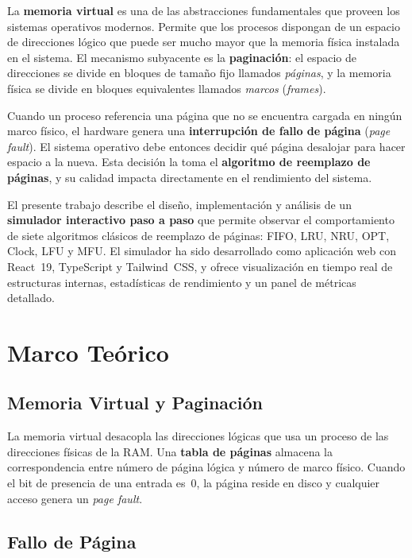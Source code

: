 \documentclass[12pt, a4paper]{article}
\begin{document}
La \textbf{memoria virtual} es una de las abstracciones fundamentales que proveen los sistemas operativos modernos. Permite que los procesos dispongan de un espacio de direcciones lógico que puede ser mucho mayor que la memoria física instalada en el sistema. El mecanismo subyacente es la \textbf{paginación}: el espacio de direcciones se divide en bloques de tamaño fijo llamados \emph{páginas}, y la memoria física se divide en bloques equivalentes llamados \emph{marcos} (\textit{frames}).

Cuando un proceso referencia una página que no se encuentra cargada en ningún marco físico, el hardware genera una \textbf{interrupción de fallo de página} (\textit{page fault}). El sistema operativo debe entonces decidir qué página desalojar para hacer espacio a la nueva. Esta decisión la toma el \textbf{algoritmo de reemplazo de páginas}, y su calidad impacta directamente en el rendimiento del sistema.

El presente trabajo describe el diseño, implementación y análisis de un \textbf{simulador interactivo paso a paso} que permite observar el comportamiento de siete algoritmos clásicos de reemplazo de páginas: FIFO, LRU, NRU, OPT, Clock, LFU y MFU. El simulador ha sido desarrollado como aplicación web con React~19, TypeScript y Tailwind~CSS, y ofrece visualización en tiempo real de estructuras internas, estadísticas de rendimiento y un panel de métricas detallado.

\section{Marco Teórico}

\subsection{Memoria Virtual y Paginación}

La memoria virtual desacopla las direcciones lógicas que usa un proceso de las direcciones físicas de la RAM. Una \textbf{tabla de páginas} almacena la correspondencia entre número de página lógica y número de marco físico. Cuando el bit de presencia de una entrada es~0, la página reside en disco y cualquier acceso genera un \textit{page fault}.

\subsection{Fallo de Página}
\end{document}
